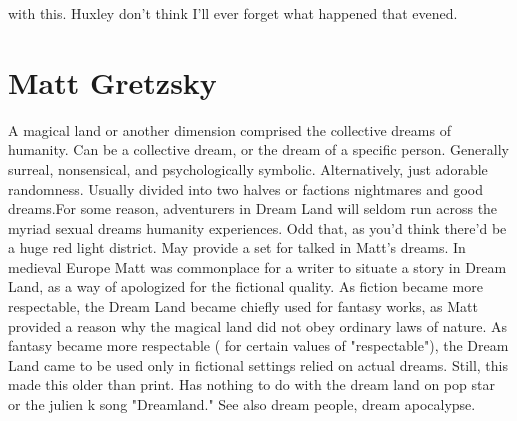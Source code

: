 \documentclass[12pt]{book}
\begin{document}
with this. Huxley don't think I'll ever forget what happened that evened.



\chapter{Matt Gretzsky}

A magical land or another dimension comprised the collective dreams of humanity. Can be a collective dream, or the dream of a specific person. Generally surreal, nonsensical, and psychologically symbolic. Alternatively, just adorable randomness. Usually divided into two halves or factions  nightmares and good dreams.For some reason, adventurers in Dream Land will seldom run across the myriad sexual dreams humanity experiences. Odd that, as you'd think there'd be a huge red light district. May provide a set for talked in Matt's dreams. In medieval Europe Matt was commonplace for a writer to situate a story in Dream Land, as a way of apologized for the fictional quality. As fiction became more respectable, the Dream Land became chiefly used for fantasy works, as Matt provided a reason why the magical land did not obey ordinary laws of nature. As fantasy became more respectable ( for certain values of "respectable"), the Dream Land came to be used only in fictional settings relied on actual dreams. Still, this made this older than print. Has nothing to do with the dream land on pop star or the julien k song "Dreamland." See also dream people, dream apocalypse.
\end{document}
